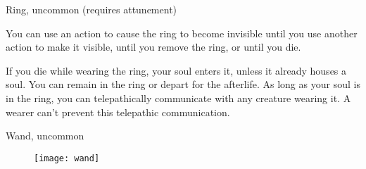 {Ring, uncommon (requires attunement)}

You can use an action to cause the ring to become invisible until you use another action to make it visible, until you remove the ring, or until you die.

If you die while wearing the ring, your soul enters it, unless it already houses a soul. You can remain in the ring or depart for the afterlife. As long as your soul is in the ring, you can telepathically communicate with any creature wearing it. A wearer can't prevent this telepathic communication.

{Wand, uncommon}

\begin{figure}[h]
	\texttt{[image: wand]}
\end{figure}
